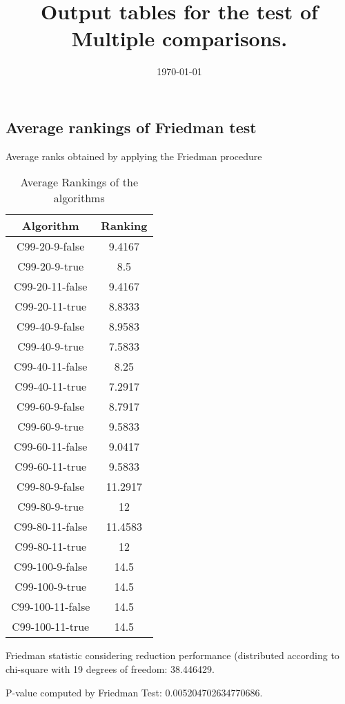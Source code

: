 \documentclass[a4paper,10pt]{article}
\title{Output tables for the test of Multiple comparisons.}
\author{}
\date{\today}
\begin{document}
\begin{landscape}
\pagestyle{empty}
\maketitle
\thispagestyle{empty}
\section{Average rankings of Friedman test}



Average ranks obtained by applying the Friedman procedure

\begin{table}[!htp]
\centering
\begin{tabular}{|c|c|}\hline
Algorithm&Ranking\\\hline
C99-20-9-false & 9.4167\\
C99-20-9-true & 8.5\\
C99-20-11-false & 9.4167\\
C99-20-11-true & 8.8333\\
C99-40-9-false & 8.9583\\
C99-40-9-true & 7.5833\\
C99-40-11-false & 8.25\\
C99-40-11-true & 7.2917\\
C99-60-9-false & 8.7917\\
C99-60-9-true & 9.5833\\
C99-60-11-false & 9.0417\\
C99-60-11-true & 9.5833\\
C99-80-9-false & 11.2917\\
C99-80-9-true & 12\\
C99-80-11-false & 11.4583\\
C99-80-11-true & 12\\
C99-100-9-false & 14.5\\
C99-100-9-true & 14.5\\
C99-100-11-false & 14.5\\
C99-100-11-true & 14.5\\
\hline
\end{tabular}
\caption{Average Rankings of the algorithms}
\end{table}

Friedman statistic considering reduction performance (distributed according to chi-square with 19 degrees of freedom: 38.446429.

P-value computed by Friedman Test: 0.005204702634770686.\newline




\end{landscape}
\end{document}
